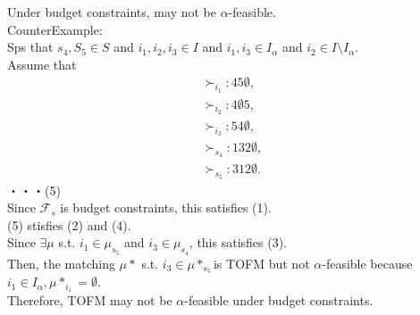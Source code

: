 \documentclass[a4j,10pt]{jsarticle}
\theoremstyle{definition}
\theoremstyle{remark}
\theoremstyle{plain}
\begin{document}
\begin{tcolorbox}
  Under budget constraints, may not be $\alpha$-feasible.\\
  CounterExample: \\
  Sps that $s_4,S_5 \in S$ and $i_1,i_2,i_3 \in I$ and $i_1,i_3 \in I_\alpha$ and $i_2 \in I \setminus I_\alpha$.\\
  Assume that 
  \begin{align*}
    \succ_{i_1}:45\emptyset, \\
    \succ_{i_2}:4\emptyset 5, \\
    \succ_{i_3}:54\emptyset ,\\
    \succ_{s_4}:132\emptyset,\\
    \succ_{s_5}:312\emptyset.
  \end{align*}・・・(5)\\
  Since $\mathcal{F}_s$ is budget constraints, this satisfies (1).\\
  (5) stisfies (2) and (4).\\
  Since $\exists \mu$ s.t. $i_1 \in \mu_{s_5}$ and $i_3 \in \mu_{s_4}$, this satisfies (3).\\Then, the matching $\mu*$ s.t. $i_3 \in \mu*_{s_5}$is TOFM but not $\alpha$-feasible because $i_1 \in I_\alpha, \mu*_{i_1} = \emptyset$.\\
  Therefore, TOFM may not be $\alpha$-feasible under budget constraints.
\end{tcolorbox}
\end{document}
